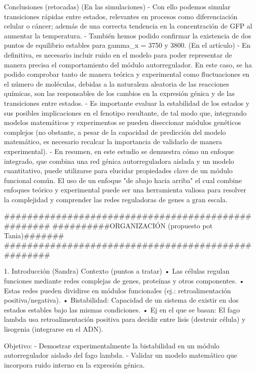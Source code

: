 Conclusiones (retocadas)
	(En las simulaciones)
	- Con ello podemos simular transiciones rápidas entre estados, relevantes en procesos como diferenciación celular o cáncer; además de una correcta tendencia en la concentración de GFP al aumentar la temperatura.
	- También hemos podido confirmar la existencia de dos puntos de equilibrio estables para gamma_x = 3750 y 3800.
	(En el artículo)
	- En definitiva, es necesario incluir ruido en el modelo para poder representar de manera precisa el comportamiento del módulo autorregulador. En este caso, se ha podido comprobar tanto de manera teórica y experimental como fluctuaciones en el número de moléculas, debidas a la naturaleza aleatoria de las reacciones químicas, son las responsables de los cambios en la expresión génica y de las transiciones entre estados. 
	- Es importante evaluar la estabilidad de los estados y sus posibles implicaciones en el fenotipo resultante, de tal modo que, integrando modelos matemáticos y experimentos se pueden diseccionar módulos genéticos complejos (no obstante, a pesar de la capacidad de predicción del modelo matemático, es necesario recalcar la importancia de validarlo de manera experimental).
	- En resumen, en este estudio se demuestra cómo un enfoque integrado, que combina una red génica autorreguladora aislada y un modelo cuantitativo, puede utilizarse para elucidar propiedades clave de un módulo funcional común. El uso de un enfoque "de abajo hacia arriba" el cual combine enfoques teórico y experimental puede ser una herramienta valiosa para resolver la complejidad y comprender las redes reguladoras de genes a gran escala.



###################################################
##########ORGANIZACIÓN (propuesto pot Tania)#######
###################################################

1. Introducción (Sandra)
Contexto (puntos a tratar)
•	Las células regulan funciones mediante redes complejas de genes, proteínas y otros componentes.
•	Estas redes pueden dividirse en módulos funcionales (ej.: retroalimentación positiva/negativa).
•	Bistabilidad: Capacidad de un sistema de existir en dos estados estables bajo las mismas condiciones.
•	Ej en el que se basan: El fago lambda usa retroalimentación positiva para decidir entre lisis (destruir célula) y lisogenia (integrarse en el ADN).

Objetivo:
- Demostrar experimentalmente la bistabilidad en un módulo autorregulador aislado del fago lambda.
- Validar un modelo matemático que incorpora ruido interno en la expresión génica.

